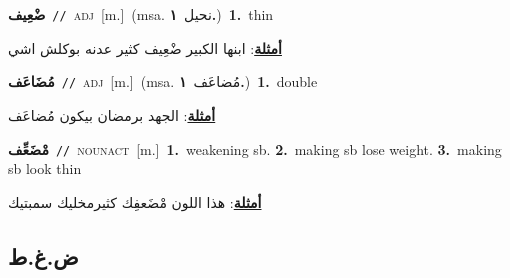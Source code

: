 \documentclass[10pt,a4paper,twoside]{article} %
\begin{document}
\begin{multicols}{2}
{\setlength\topsep{0pt}\textbf{\foreignlanguage{arabic}{ضْعِيف}}\ {\color{gray}\texttt{//}\color{black}}\ \textsc{adj}\ [m.]\ \color{gray}(msa. \foreignlanguage{arabic}{نحيل}~\foreignlanguage{arabic}{\textbf{١.}})\color{black}\ \textbf{1.}~thin\  \begin{flushright}\color{gray}\foreignlanguage{arabic}{\textbf{\underline{\foreignlanguage{arabic}{أمثلة}}}: ابنها الكبير ضْعِيف كثير عدنه بوكلش اشي}\end{flushright}\color{black}} \vspace{2mm}

{\setlength\topsep{0pt}\textbf{\foreignlanguage{arabic}{مُضَاعَف}}\ {\color{gray}\texttt{//}\color{black}}\ \textsc{adj}\ [m.]\ \color{gray}(msa. \foreignlanguage{arabic}{مُضاعَف}~\foreignlanguage{arabic}{\textbf{١.}})\color{black}\ \textbf{1.}~double\  \begin{flushright}\color{gray}\foreignlanguage{arabic}{\textbf{\underline{\foreignlanguage{arabic}{أمثلة}}}: الجهد برمضان بيكون مُضاعَف}\end{flushright}\color{black}} \vspace{2mm}

{\setlength\topsep{0pt}\textbf{\foreignlanguage{arabic}{مْضَعِّف}}\ {\color{gray}\texttt{//}\color{black}}\ \textsc{noun\textunderscore act}\ [m.]\ \textbf{1.}~weakening sb.  \textbf{2.}~making sb lose weight.  \textbf{3.}~making sb look thin\  \begin{flushright}\color{gray}\foreignlanguage{arabic}{\textbf{\underline{\foreignlanguage{arabic}{أمثلة}}}: هذا اللون مْضَعفِك كثيرمخليك سمبتيك}\end{flushright}\color{black}} \vspace{2mm}

\vspace{-3mm}
\subsection*{\color{blue}\foreignlanguage{arabic}{ض.غ.ط}\color{blue}{}} 


\end{multicols}
\end{document}
